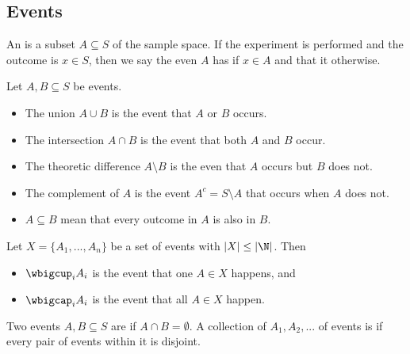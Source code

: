 \documentclass{article}
\begin{document}
\subsection{Events}
\begin{definition}
    An  is a subset $A\subseteq S$ of the sample space. If the experiment is performed and the
    outcome is $x\in S$, then we say the even $A$ has  if $x\in A$ and that it 
    otherwise.
\end{definition}
\begin{theorem}
    Let $A,B\subseteq S$ be events.
    \begin{itemize}
        \item The union $A\cup B$ is the event that $A$ or $B$ occurs.
        \item The intersection $A\cap B$ is the event that both $A$ and $B$ occur.
        \item The theoretic difference $A\setminus B$ is the even that $A$ occurs but $B$ does not.
        \item The complement of $A$ is the event $A^c=S\setminus A$ that occurs when $A$ does not.
        \item $A\subseteq B$ mean that every outcome in $A$ is also in $B$.
    \end{itemize}
\end{theorem}
\begin{definition}
    Let $X=\{A_1, ..., A_n\}$ be a set of events with $|X|\leq |\N|$. Then 
    \begin{itemize}
        \item $\wbigcup_i A_i$ is the event that one $A\in X$ happens, and
        \item $\wbigcap_i A_i$ is the event that all $A\in X$ happen.
    \end{itemize}
\end{definition}
\begin{definition}
    Two events $A,B\subseteq S$ are  if $A\cap B=\emptyset$. 
    A collection of $A_1, A_2,...$ of events is  if every pair of
    events within it is disjoint.
\end{definition}
\end{document}
